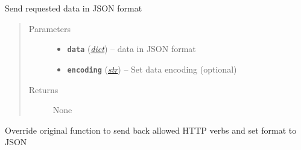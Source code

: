 \documentclass[letterpaper,10pt,english]{sphinxmanual}
\begin{document}
\begin{fulllineitems}

\begin{fulllineitems}
\label{util/api:escape.util.api.AbstractRequestHandler._send_json_response}
Send requested data in JSON format
\begin{quote}\begin{description}
\item[{Parameters}] \leavevmode\begin{itemize}
\item {} 
\textbf{\texttt{data}} (\href{https://docs.python.org/2.7/library/stdtypes.html\#dict}{\emph{dict}}) -- data in JSON format

\item {} 
\textbf{\texttt{encoding}} (\href{https://docs.python.org/2.7/library/functions.html\#str}{\emph{str}}) -- Set data encoding (optional)

\end{itemize}

\item[{Returns}] \leavevmode
None

\end{description}\end{quote}

\end{fulllineitems}


\begin{fulllineitems}
\label{util/api:escape.util.api.AbstractRequestHandler.error_content_type}
\end{fulllineitems}


\begin{fulllineitems}
\label{util/api:escape.util.api.AbstractRequestHandler.send_error}
Override original function to send back allowed HTTP verbs and set format
to JSON

\end{fulllineitems}



\end{fulllineitems}
\end{document}
